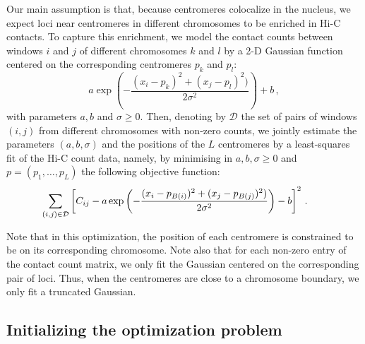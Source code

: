 Our main assumption is that, because centromeres colocalize in the nucleus, we
expect loci near centromeres in different chromosomes to be enriched in
Hi-C contacts.
To capture this enrichment, we model the contact counts between
windows $i$ and $j$ of different chromosomes $k$ and $l$ by a 2-D
Gaussian function centered on the corresponding centromeres $p_k$ and
$p_l$:
$$
a\exp \left(- \frac{(x_i - p_k)^2 + (x_j - p_l)^2)}{2\sigma^2}\right) + b\,,
$$
with parameters $a, b$ and $\sigma\geq 0$.
Then, denoting by $\mathcal{D}$ the set
of pairs of windows $(i,j)$ from different chromosomes with non-zero
counts, we jointly estimate the parameters $(a,b,\sigma)$ and the
positions of the $L$ centromeres by a least-squares fit of the Hi-C count data,
namely, by minimising in $a,b,\sigma\geq 0$ and $p=(p_1, \ldots, p_L)$ the
following objective function:
\begin{equation}\label{eq:opt}
\hspace*{-0.65cm}
\sum_{(i,j)\in\mathcal{D}} \left[ C_{ij} - a\exp \left(- \frac{(x_i - p_{B(i)})^2 + (x_j - p_{B(j)})^2)}{2\sigma^2}\right) - b \right]^2\,.
\end{equation}


Note that in this optimization, the position of each centromere is constrained
to be on its corresponding chromosome. Note also that for each non-zero entry
of the contact count matrix, we only fit the Gaussian
centered on the corresponding pair of loci. Thus, when the centromeres are
close to a chromosome boundary, we only fit a truncated
Gaussian.

\subsection{Initializing the optimization problem}

